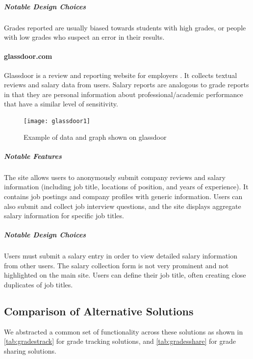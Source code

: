 \subparagraph{Notable Design Choices}
Grades reported are usually biased towards students with high grades, or people with low grades who suspect an error in their results.

\paragraph{glassdoor.com}

Glassdoor is a review and reporting website for employers \cite{glassdoor}. It collects textual reviews and salary data from users. Salary reports are analogous to grade reports in that they are personal information about professional/academic performance that have a similar level of sensitivity.

\begin{figure}[H]
\noindent \texttt{[image: glassdoor1]}
\centering
\caption{Example of data and graph shown on glassdoor}
\label{fig:glassdoor-data}
\end{figure}

\subparagraph{Notable Features}
The site allows users to anonymously submit company reviews and salary information (including job title, locations of position, and years of experience). It contains job postings and company profiles with generic information. Users can also submit and collect job interview questions, and the site displays aggregate salary information for specific job titles.

\subparagraph{Notable Design Choices}

Users must submit a salary entry in order to view detailed salary information from other users. The salary collection form is not very prominent and not highlighted on the main site. Users can define their job title, often creating close duplicates of job titles.

\subsection{Comparison of Alternative Solutions}
We abstracted a common set of functionality across these solutions as shown in \autoref{tab:gradestrack} for grade tracking solutions, and \autoref{tab:gradesshare} for grade sharing solutions.

